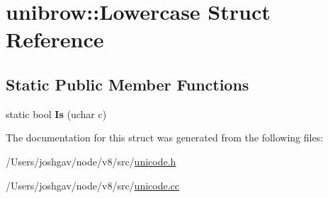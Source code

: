\hypertarget{structunibrow_1_1_lowercase}{}\section{unibrow\+:\+:Lowercase Struct Reference}
\label{structunibrow_1_1_lowercase}
\subsection*{Static Public Member Functions}
\begin{DoxyCompactItemize}
\item 
static bool {\bfseries Is} (uchar c)\hypertarget{structunibrow_1_1_lowercase_ab275138a1dc36a592549281894ac0f74}{}\label{structunibrow_1_1_lowercase_ab275138a1dc36a592549281894ac0f74}

\end{DoxyCompactItemize}


The documentation for this struct was generated from the following files\+:\begin{DoxyCompactItemize}
\item 
/\+Users/joshgav/node/v8/src/\hyperlink{unicode_8h}{unicode.\+h}\item 
/\+Users/joshgav/node/v8/src/\hyperlink{unicode_8cc}{unicode.\+cc}\end{DoxyCompactItemize}
